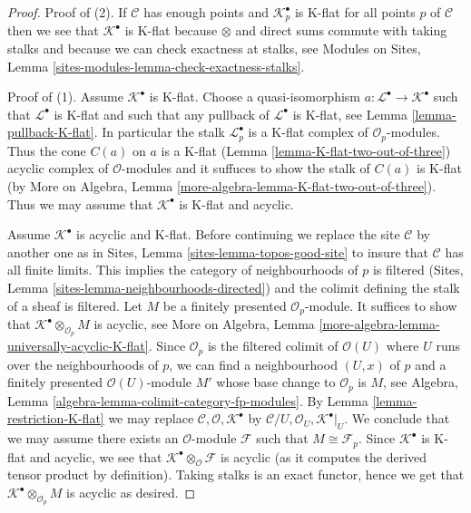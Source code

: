 \begin{proof}
Proof of (2). If $\mathcal{C}$ has enough points and
$\mathcal{K}_p^\bullet$ is K-flat for all points $p$ of $\mathcal{C}$
then we see that $\mathcal{K}^\bullet$ is K-flat because $\otimes$ and
direct sums commute with taking stalks and because we can check exactness
at stalks, see
Modules on Sites, Lemma \ref{sites-modules-lemma-check-exactness-stalks}.

\medskip\noindent
Proof of (1). Assume $\mathcal{K}^\bullet$ is K-flat.
Choose a quasi-isomorphism $a : \mathcal{L}^\bullet \to \mathcal{K}^\bullet$
such that $\mathcal{L}^\bullet$ is K-flat and such that any pullback
of $\mathcal{L}^\bullet$ is K-flat, see
Lemma \ref{lemma-pullback-K-flat}. In particular the stalk
$\mathcal{L}_p^\bullet$ is a K-flat complex of $\mathcal{O}_p$-modules.
Thus the cone $C(a)$ on $a$ is a K-flat
(Lemma \ref{lemma-K-flat-two-out-of-three})
acyclic complex of $\mathcal{O}$-modules and it suffuces
to show the stalk of $C(a)$ is K-flat
(by More on Algebra, Lemma \ref{more-algebra-lemma-K-flat-two-out-of-three}).
Thus we may assume that $\mathcal{K}^\bullet$ is K-flat and acyclic.

\medskip\noindent
Assume $\mathcal{K}^\bullet$ is acyclic and K-flat. Before continuing
we replace the site $\mathcal{C}$ by another one as in
Sites, Lemma \ref{sites-lemma-topos-good-site}
to insure that $\mathcal{C}$ has all finite
limits. This implies the category of neighbourhoods of $p$ is filtered
(Sites, Lemma \ref{sites-lemma-neighbourhoods-directed})
and the colimit defining the stalk of a sheaf is filtered.
Let $M$ be a finitely presented $\mathcal{O}_p$-module.
It suffices to show that $\mathcal{K}^\bullet \otimes_{\mathcal{O}_p} M$
is acyclic, see
More on Algebra, Lemma \ref{more-algebra-lemma-universally-acyclic-K-flat}.
Since $\mathcal{O}_p$ is the filtered colimit of $\mathcal{O}(U)$
where $U$ runs over the neighbourhoods of $p$, we
can find a neighbourhood $(U, x)$ of $p$ and a finitely
presented $\mathcal{O}(U)$-module $M'$ whose base change
to $\mathcal{O}_p$ is $M$, see
Algebra, Lemma \ref{algebra-lemma-colimit-category-fp-modules}.
By Lemma \ref{lemma-restriction-K-flat}
we may replace $\mathcal{C}, \mathcal{O}, \mathcal{K}^\bullet$
by $\mathcal{C}/U, \mathcal{O}_U, \mathcal{K}^\bullet|_U$.
We conclude that we may assume there exists an $\mathcal{O}$-module
$\mathcal{F}$ such that $M \cong \mathcal{F}_p$.
Since $\mathcal{K}^\bullet$ is K-flat and acyclic,
we see that $\mathcal{K}^\bullet \otimes_\mathcal{O} \mathcal{F}$
is acyclic (as it computes the derived tensor product by
definition). Taking stalks is an exact functor, hence we get that
$\mathcal{K}^\bullet \otimes_{\mathcal{O}_p} M$
is acyclic as desired.
\end{proof}

